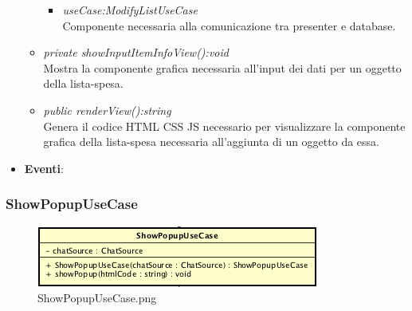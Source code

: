 \begin{itemize}
\begin{itemize}
{\begin{itemize}
			Componente grafica per l'input dei dati relativi a un oggetto della lista-spesa.
		\item \textit{useCase:ModifyListUseCase}\\
			Componente necessaria alla comunicazione tra presenter e database.
		\end{itemize}}
	\item \textit{private showInputItemInfoView():void}\\
	Mostra la componente grafica necessaria all'input dei dati per un oggetto della lista-spesa.
	\item \textit{public renderView():string}\\
	Genera il codice HTML CSS JS necessario per visualizzare la componente grafica della lista-spesa necessaria all'aggiunta di un oggetto da essa.
	\end{itemize}
\item \textbf{Eventi}:
\end{itemize}

\subsubsection{ShowPopupUseCase}

\label{ShowPopupUseCase}
\begin{figure}[ht]
	\centering
	\includegraphics[scale=0.5]{Sezioni/SottosezioniST/img/app/ShowPopupUseCase.png}
	\caption{ShowPopupUseCase.png}
\end{figure}

